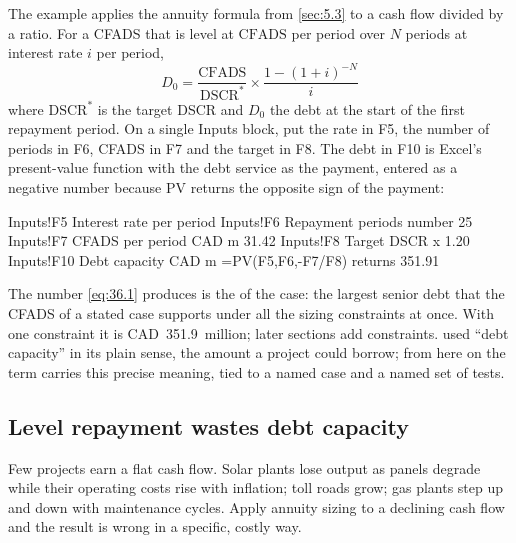 The example applies the annuity formula from \cref{sec:5.3} to a cash flow divided by a ratio. For a CFADS that is level at $\mathrm{CFADS}$ per period over $N$ periods at interest rate $i$ per period,
\begin{equation}\label{eq:36.1}
D_0 = \frac{\mathrm{CFADS}}{\mathrm{DSCR}^{*}} \times \frac{1-(1+i)^{-N}}{i}
\end{equation}
where $\mathrm{DSCR}^{*}$ is the target DSCR and $D_0$ the debt at the start of the first repayment period. On a single Inputs block, put the rate in F5, the number of periods in F6, CFADS in F7 and the target in F8. The debt in F10 is Excel's present-value function with the debt service as the payment, entered as a negative number because PV returns the opposite sign of the payment:
\begin{excel}
Inputs!F5    Interest rate per period    %
Inputs!F6    Repayment periods           number  25
Inputs!F7    CFADS per period            CAD m   31.42
Inputs!F8    Target DSCR                 x       1.20
Inputs!F10   Debt capacity               CAD m   =PV(F5,F6,-F7/F8)      returns 351.91
\end{excel}

The number \cref{eq:36.1} produces is the  of the case: the largest senior debt that the CFADS of a stated case supports under all the sizing constraints at once. With one constraint it is CAD~351.9~million; later sections add constraints.  used ``debt capacity'' in its plain sense, the amount a project could borrow; from here on the term carries this precise meaning, tied to a named case and a named set of tests.

\subsection{Level repayment wastes debt capacity}\label{ssec:36.1.2}

Few projects earn a flat cash flow. Solar plants lose output as panels degrade while their operating costs rise with inflation; toll roads grow; gas plants step up and down with maintenance cycles. Apply annuity sizing to a declining cash flow and the result is wrong in a specific, costly way.

